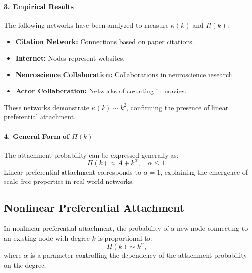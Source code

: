 \documentclass{article}
\begin{document}
\paragraph{3. Empirical Results}
The following networks have been analyzed to measure \( \kappa(k) \) and \( \Pi(k) \):
\begin{itemize}
    \item \textbf{Citation Network:} Connections based on paper citations.
    \item \textbf{Internet:} Nodes represent websites.
    \item \textbf{Neuroscience Collaboration:} Collaborations in neuroscience research.
    \item \textbf{Actor Collaboration:} Networks of co-acting in movies.
\end{itemize}

These networks demonstrate \( \kappa(k) \sim k^2 \), confirming the presence of linear preferential attachment.

\paragraph{4. General Form of \( \Pi(k) \)}
The attachment probability can be expressed generally as:
\begin{equation}
\Pi(k) \approx A + k^\alpha, \quad \alpha \leq 1.
\end{equation}
Linear preferential attachment corresponds to \( \alpha = 1 \), explaining the emergence of scale-free properties in real-world networks.


\subsection{Nonlinear Preferential Attachment}

In nonlinear preferential attachment, the probability of a new node connecting to an existing node with degree \( k \) is proportional to:
\begin{equation}
\Pi(k) \sim k^\alpha,
\end{equation}
where \( \alpha \) is a parameter controlling the dependency of the attachment probability on the degree.
\end{document}
